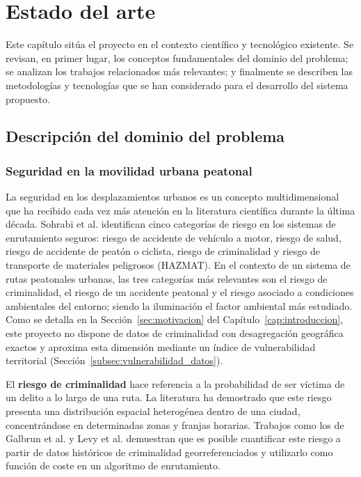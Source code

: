 \chapter{Estado del arte}
\label{cap:estadoarte}

Este capítulo sitúa el proyecto en el contexto científico y tecnológico existente. Se revisan, en primer lugar, los conceptos fundamentales del dominio del problema; se analizan los trabajos relacionados más relevantes; y finalmente se describen las metodologías y tecnologías que se han considerado para el desarrollo del sistema propuesto.

\section{Descripción del dominio del problema}
\label{sec:dominio}

\subsection{Seguridad en la movilidad urbana peatonal}
\label{subsec:seguridad_urbana}

La seguridad en los desplazamientos urbanos es un concepto multidimensional que ha recibido cada vez más atención en la literatura científica durante la última década. Sohrabi et al. \cite{sohrabi2022} identifican cinco categorías de riesgo en los sistemas de enrutamiento seguros: riesgo de accidente de vehículo a motor, riesgo de salud, riesgo de accidente de peatón o ciclista, riesgo de criminalidad y riesgo de transporte de materiales peligrosos (HAZMAT). En el contexto de un sistema de rutas peatonales urbanas, las tres categorías más relevantes son el riesgo de criminalidad, el riesgo de un accidente peatonal y el riesgo asociado a condiciones ambientales del entorno; siendo la iluminación el factor ambiental más estudiado. Como se detalla en la Sección~\ref{sec:motivacion} del Capítulo~\ref{cap:introduccion}, este proyecto no dispone de datos de criminalidad con desagregación geográfica exactos y aproxima esta dimensión mediante un índice de vulnerabilidad territorial (Sección~\ref{subsec:vulnerabilidad_datos}).

El \textbf{riesgo de criminalidad} hace referencia a la probabilidad de ser víctima de un delito a lo largo de una ruta. La literatura ha demostrado que este riesgo presenta una distribución espacial heterogénea dentro de una ciudad, concentrándose en determinadas zonas y franjas horarias. Trabajos como los de Galbrun et al. \cite{galbrun2016} y Levy et al. \cite{levy2020} demuestran que es posible cuantificar este riesgo a partir de datos históricos de criminalidad georreferenciados y utilizarlo como función de coste en un algoritmo de enrutamiento.

